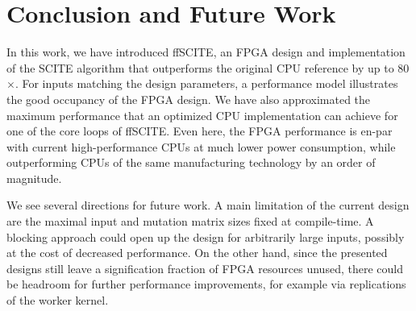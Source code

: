 \section{Conclusion and Future Work}

In this work, we have introduced \ac{ffSCITE}, an \ac{FPGA} design and implementation of the \ac{SCITE} algorithm that outperforms the original CPU reference by up to 80$\times$. %
For inputs matching the design parameters, a performance model illustrates the good occupancy of the FPGA design.
We have also approximated the maximum performance that an optimized CPU implementation can achieve for one of the core loops of \ac{ffSCITE}. Even here, the FPGA performance is en-par with current high-performance CPUs at much lower power consumption, while outperforming CPUs of the same manufacturing technology by an order of magnitude.

We see several directions for future work. A main limitation of the current design are the maximal input and mutation matrix sizes fixed at compile-time. A blocking approach could open up the design for arbitrarily large inputs, possibly at the cost of decreased performance.
On the other hand, since the presented designs still leave a signification fraction of FPGA resources unused, there could be headroom for further performance improvements, for example via replications of the worker kernel.

